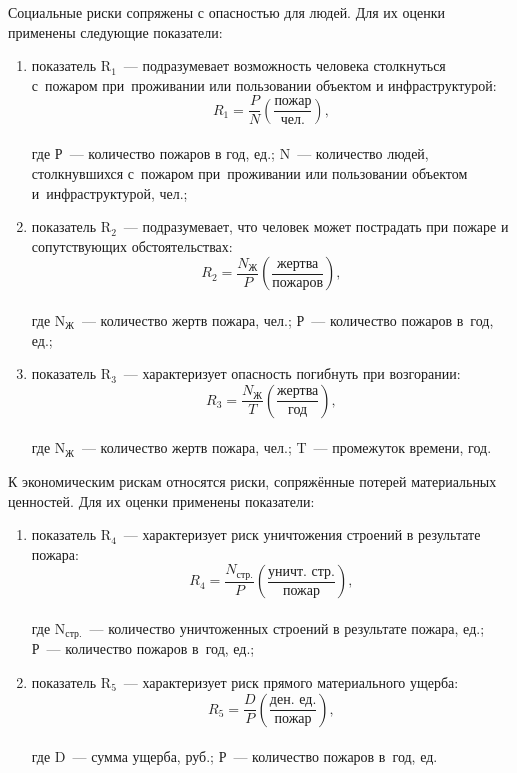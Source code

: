 Социальные риски сопряжены с опасностью для людей. Для их оценки применены следующие показатели:
\begin{enumerate}[noitemsep]\vspace{-8pt}
  \item показатель R$_1$~--- подразумевает возможность человека столкнуться с~пожаром при~проживании или пользовании объектом и инфраструктурой:\\
  $$R_{1}=\frac{P}{N}\left(\dfrac{\text{пожар}}{\text{чел.}}\right),$$\\
  где Р~--- количество пожаров в год, ед.; N~--- количество людей, столкнувшихся с~пожаром при~проживании или пользовании объектом и~инфраструктурой, чел.;
  \item показатель R$_2$~--- подразумевает, что человек может пострадать при пожаре и сопутствующих обстоятельствах:\\
  $$R_{2}=\frac{N_\text{Ж}}{P}\left(\dfrac{\text{жертва}}{\text{пожаров}}\right),$$\\
  где N$_\text{Ж}$~--- количество жертв пожара, чел.; Р~--- количество пожаров в~год, ед.;
  \item показатель R$_3$~--- характеризует опасность погибнуть при возгорании:\\
    $$R_{3}=\frac{N_\text{Ж}}{T}\left(\dfrac{\text{жертва}}{\text{год}}\right),$$\\
    где N$_\text{Ж}$~--- количество жертв пожара, чел.; T~--- промежуток времени, год.
\end{enumerate}
 \vspace{-8pt}
\clearpage
К экономическим рискам относятся риски, сопряжённые потерей материальных ценностей. Для их оценки применены показатели:
\begin{enumerate}[noitemsep]\vspace{-8pt}
  \item показатель R$_4$~--- характеризует риск уничтожения строений в результате пожара:\\
  $$R_{4}=\frac{N_\text{стр.}}{P}\left(\dfrac{\text{уничт. стр.}}{\text{пожар}}\right),$$\\
  где N$_\text{стр.}$~---  количество уничтоженных строений в результате пожара, ед.; Р~--- количество пожаров в~год, ед.;
  \item показатель R$_5$~--- характеризует риск прямого материального ущерба:\\
  $$R_{5}=\frac{D}{P}\left(\dfrac{\text{ден. ед.}}{\text{пожар}}\right),$$\\
    где D~--- сумма ущерба, руб.; Р~--- количество пожаров в~год, ед.
\end{enumerate}
 \vspace{-8pt}

